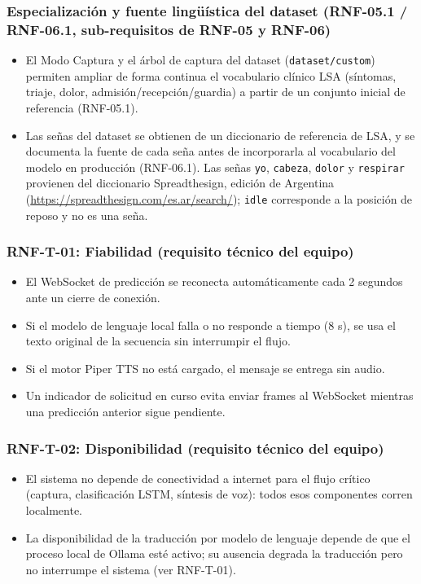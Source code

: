 \subsubsection{Especialización y fuente lingüística del dataset (RNF-05.1 / RNF-06.1, sub-requisitos de RNF-05 y RNF-06)}
\begin{itemize}
    \item El Modo Captura y el árbol de captura del dataset (\texttt{dataset/custom}) permiten ampliar de forma continua el vocabulario clínico LSA (síntomas, triaje, dolor, admisión/recepción/guardia) a partir de un conjunto inicial de referencia (RNF-05.1).
    \item Las señas del dataset se obtienen de un diccionario de referencia de LSA, y se documenta la fuente de cada seña antes de incorporarla al vocabulario del modelo en producción (RNF-06.1). Las señas \texttt{yo}, \texttt{cabeza}, \texttt{dolor} y \texttt{respirar} provienen del diccionario Spreadthesign, edición de Argentina (\url{https://spreadthesign.com/es.ar/search/}); \texttt{idle} corresponde a la posición de reposo y no es una seña.
\end{itemize}

\subsubsection{RNF-T-01: Fiabilidad (requisito técnico del equipo)}
\begin{itemize}
    \item El WebSocket de predicción se reconecta automáticamente cada 2 segundos ante un cierre de conexión.
    \item Si el modelo de lenguaje local falla o no responde a tiempo (8 s), se usa el texto original de la secuencia sin interrumpir el flujo.
    \item Si el motor Piper TTS no está cargado, el mensaje se entrega sin audio.
    \item Un indicador de solicitud en curso evita enviar frames al WebSocket mientras una predicción anterior sigue pendiente.
\end{itemize}

\subsubsection{RNF-T-02: Disponibilidad (requisito técnico del equipo)}
\begin{itemize}
    \item El sistema no depende de conectividad a internet para el flujo crítico (captura, clasificación LSTM, síntesis de voz): todos esos componentes corren localmente.
    \item La disponibilidad de la traducción por modelo de lenguaje depende de que el proceso local de Ollama esté activo; su ausencia degrada la traducción pero no interrumpe el sistema (ver RNF-T-01).
\end{itemize}

